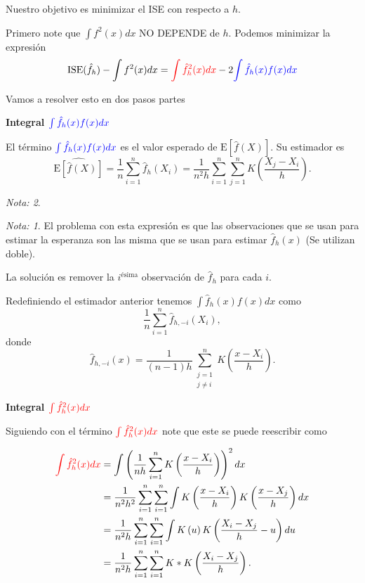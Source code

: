 \documentclass[
  12pt,
]{book}
\theoremstyle{definition}
\theoremstyle{definition}
\theoremstyle{definition}
\theoremstyle{remark}
\newtheorem*{remark}{Nota: }
\begin{document}
Nuestro objetivo es minimizar el ISE con respecto a \(h\).

Primero note que \(\int f^{2}(x)dx\) NO DEPENDE de \(h\). Podemos minimizar la expresión
\begin{equation*}
\mathrm{ISE}(\hat{f}_{h})-\int f^{2}(x)dx=
\textcolor{red}{\int\hat{f}_{h}^{2}(x)dx}
-2
\textcolor{blue}{\int\hat{f}_{h}(x)f(x)dx}
\end{equation*}

Vamos a resolver esto en dos pasos partes

\textbf{Integral \(\textcolor{blue}{\int\hat{f}_{h}(x)f(x)dx}\)}

El término \(\textcolor{blue}{\int\hat{f}_{h}(x)f(x)dx}\) es el valor esperado de
\(\mathrm{E}\left[\hat{f}(X)\right]\). Su estimador es
\begin{equation*}
\widehat{\mathrm{E}\left[\hat{f}(X)\right]}
= \frac{1}{n}\sum_{i=1}^{n}\hat{f}_{h}(X_{i})
=\frac{1}{n^{2}h}\sum_{i=1}^{n}\sum_{j=1}^{n}
K\left(\frac{X_{j}-X_{i}}{h}\right).
\end{equation*}

\begin{remark}
\begin{remark}

{}El problema con esta expresión es que las observaciones que se usan para estimar la esperanza son las misma que se usan para estimar \(\hat{f}_{h}(x)\) (Se utilizan doble).

\end{remark}
\end{remark}

La solución es remover la \(i^{\text{ésima}}\) observación de \(\hat{f}_{h}\) para cada \(i\).

Redefiniendo el estimador anterior tenemos \(\int \hat{f}_{h}(x)f(x)dx\) como
\[
\frac{1}{n}\sum_{i=1}^{n}\hat{f}_{h,-i}(X_{i}),
\]
donde
\[
\hat{f}_{h,-i}(x)=\frac{1}{(n-1)h}\sum_{\substack{j=1\\ j\neq i}}^{n}K\left( \frac{x-X_{i}}{h} \right) .
\]

\textbf{Integral \(\textcolor{red}{\int\hat{f}_{h}^{2}(x)dx}\)}

Siguiendo con el término \(\textcolor{red}{\int\hat{f}_{h}^{2}(x)dx}\) note que este se puede reescribir como

\begin{align*}
\textcolor{red}{\int\hat{f}_{h}^{2}(x)dx}
& =\int\left(\frac{1}{nh}\sum_{i=1}^{n}K\left( \frac{x-X_{i}}{h} \right)\right)^{2}dx                                    \\
& =\frac{1}{n^{2}h^{2}}\sum_{i=1}^{n}\sum_{i=1}^{n}\int K\left(\frac{x-X_{i}}{h}\right)K\left(\frac{x-X_{j}}{h}\right)dx \\
& =\frac{1}{n^{2}h}\sum_{i=1}^{n}\sum_{i=1}^{n}\int K\left(u\right)K\left(\frac{X_{i}-X_{j}}{h}-u\right)du               \\
& =\frac{1}{n^{2}h}\sum_{i=1}^{n}\sum_{i=1}^{n}K*K\left(\frac{X_{i}-X_{j}}{h}\right).
\end{align*}
\end{document}
